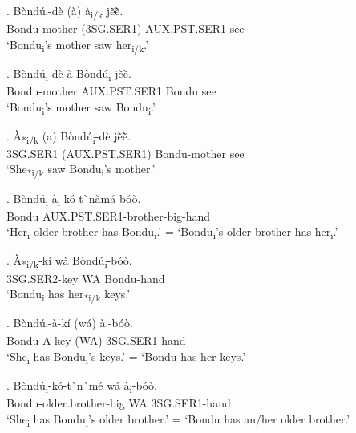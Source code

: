 \documentclass{assets/fieldnotes}
\begin{document}
\exg. B\`{o}nd\'{u}\textsubscript{i}-d\`{e} (\`{a}) \`{a}\textsubscript{i/k} jẽ̀ẽ̀. \\
Bondu-mother (3SG.SER1) AUX.PST.SER1 see \\
`Bondu\textsubscript{i}'s mother saw her\textsubscript{i/k}.'

\exg. B\`{o}nd\'{u}\textsubscript{i}-d\`{e} \`{a} B\`{o}nd\'{u}\textsubscript{i} jẽ̀ẽ̀. \\
Bondu-mother AUX.PST.SER1 Bondu see \\
`Bondu\textsubscript{i}'s mother saw Bondu\textsubscript{i}.' 

\exg. \`{A}\textsubscript{*i/k} (a) B\`{o}nd\'{u}\textsubscript{i}-d\`{e} jẽ̀ẽ̀. \\
3SG.SER1 (AUX.PST.SER1) Bondu-mother see \\
`She\textsubscript{*i/k} saw Bondu\textsubscript{i}'s mother.' 

\exg. B\`{o}nd\'{u}\textsubscript{i} \`{a}\textsubscript{i}-k\'{o}-t\`{}n\`{a}m\'{a}-b\'{o}\`{o}. \\
Bondu AUX.PST.SER1-brother-big-hand \\
`Her\textsubscript{i} older brother has Bondu\textsubscript{i}.' = `Bondu\textsubscript{i}'s older brother has her\textsubscript{i}.' 



\exg. \`{A}\textsubscript{*i/k}-k\'{i} w\`{a} B\`{o}nd\'{u}\textsubscript{i}-b\'{o}\`{o}. \\
3SG.SER2-key WA Bondu-hand \\
`Bondu\textsubscript{i} has her\textsubscript{*i/k} keys.' 

\exg. B\`{o}nd\'{u}\textsubscript{i}-\`{a}-k\'{i} (w\'{a}) \`{a}\textsubscript{i}-b\'{o}\`{o}. \\
Bondu-A-key (WA) 3SG.SER1-hand \\
`She\textsubscript{i} has Bondu\textsubscript{i}'s keys.' 
= `Bondu has her keys.'  

\exg. B\`{o}nd\'{u}\textsubscript{i}-k\'{o}-t\`{}n\`{}m\'{e} w\'{a} \`{a}\textsubscript{i}-b\'{o}\`{o}. \\
Bondu-older.brother-big WA 3SG.SER1-hand \\
`She\textsubscript{i} has Bondu\textsubscript{i}'s older brother.' = `Bondu has an/her older brother.'
\end{document}
